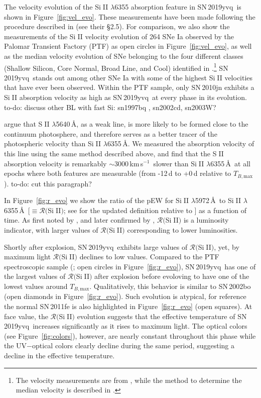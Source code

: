 \documentclass[twocolumn]{aastex63}
\def\ion#1#2{#1$\;${\footnotesize\rm{#2}}\relax}
\newcommand{\todo}[1]{{\color{magenta} to-do: {#1}}}
\newcommand{\tbmax}{$T_{B,\mathrm{max}}$}
\newcommand{\kms}{km\,s$^{-1}$}
\newcommand{\sn}{SN\,2019yvq}
\begin{document}
The velocity evolution of the \ion{Si}{II} $\lambda$6355 absorption feature
in \sn\ is shown in Figure~\ref{fig:vel_evo}. These measurements have been
made following the procedure described in \citet{Maguire14} (see their
\S2.5). For comparison, we also show the \citet{Maguire14} measurements of
the \ion{Si}{II} velocity evolution of 264 SNe Ia observed by the Palomar
Transient Factory (PTF) as open circles in Figure~\ref{fig:vel_evo}, as well
as the median velocity evolution of SNe belonging to the four different
classes (Shallow Silicon, Core Normal, Broad Line, and Cool) identified in
\citet{Branch06}.\footnote{The velocity measurements are from
\citet{Blondin12}, while the method to determine the median velocity is
described in \citet{Miller18}.} \sn\ stands out among other SNe Ia with
some of the highest \ion{Si}{II} velocities that have ever been observed.
Within the PTF sample, only SN\,2010jn exhibits a \ion{Si}{II} absorption
velocity as high as \sn\ at every phase in its evolution. \todo{discuss other
BL with fast Si: sn1997bq , sn2002cd, sn2003W?}

\citet{Benetti04} argue that \ion{S}{II} $\lambda$5640\,\AA, as a weak line,
is more likely to be formed close to the continuum photosphere, and therefore
serves as a better tracer of the photospheric velocity than \ion{Si}{II}
$\lambda$6355\,\AA. We measured the absorption velocity of this line using
the same method described above, and find that the \ion{S}{II} absorption
velocity is remarkably $\sim$3000\,\kms\ slower than \ion{Si}{II}
$\lambda$6355\,\AA\ at all epochs where both features are measurable (from
-12\,d to +0\,d relative to \tbmax). \todo{cut this paragraph?}

In Figure~\ref{fig:r_evo} we show the ratio of the pEW for \ion{Si}{II}
$\lambda$5972\,\AA\ to \ion{Si}{II} $\lambda$6355\,\AA\ [$\equiv
\mathcal{R}($\ion{Si}{II}$)$; see \citealt{Hachinger08} for the updated
definition relative to \citealt{Nugent95}] as a function of time. As first
noted by \citet{Nugent95}, and later confirmed by \citet{Hachinger08},
$\mathcal{R}($\ion{Si}{II}$)$ is a luminosity indicator, with larger values of
$\mathcal{R}($\ion{Si}{II}$)$ corresponding to lower luminosities. 

Shortly after explosion, \sn\ exhibits large values of
$\mathcal{R}($\ion{Si}{II}$)$, yet, by maximum light
$\mathcal{R}($\ion{Si}{II}$)$ declines to low values. Compared to the PTF
spectroscopic sample (\citealt{Maguire14}; open circles in
Figure~\ref{fig:r_evo}), \sn\ has one of the largest values of
$\mathcal{R}($\ion{Si}{II}$)$ after explosion before evoloving to have one of
the lowest values around \tbmax. Qualitatively, this behavior is similar to
SN\,2002bo (open diamonds in Figure~\ref{fig:r_evo}). Such evolution is
atypical, for reference the normal SN\,2011fe is also highlighted in
Figure~\ref{fig:r_evo} (open squares). At face value, the
$\mathcal{R}($\ion{Si}{II}$)$ evolution suggests that the effective
temperature of \sn\ increases significantly as it rises to maximum light. The
optical colors (see Figure~\ref{fig:colors}), however, are nearly constant
throughout this phase while the UV$ - $optical colors clearly decline during
the same period, suggesting a decline in the effective temperature.
\end{document}
